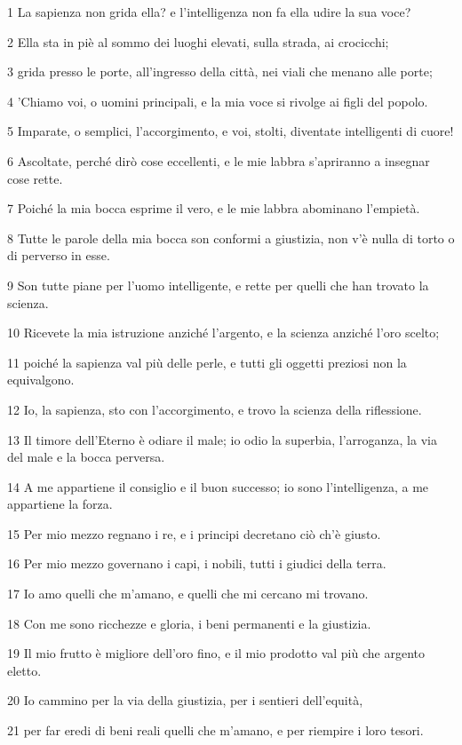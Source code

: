 \par 1 La sapienza non grida ella? e l'intelligenza non fa ella udire la sua voce?
\par 2 Ella sta in piè al sommo dei luoghi elevati, sulla strada, ai crocicchi;
\par 3 grida presso le porte, all'ingresso della città, nei viali che menano alle porte;
\par 4 'Chiamo voi, o uomini principali, e la mia voce si rivolge ai figli del popolo.
\par 5 Imparate, o semplici, l'accorgimento, e voi, stolti, diventate intelligenti di cuore!
\par 6 Ascoltate, perché dirò cose eccellenti, e le mie labbra s'apriranno a insegnar cose rette.
\par 7 Poiché la mia bocca esprime il vero, e le mie labbra abominano l'empietà.
\par 8 Tutte le parole della mia bocca son conformi a giustizia, non v'è nulla di torto o di perverso in esse.
\par 9 Son tutte piane per l'uomo intelligente, e rette per quelli che han trovato la scienza.
\par 10 Ricevete la mia istruzione anziché l'argento, e la scienza anziché l'oro scelto;
\par 11 poiché la sapienza val più delle perle, e tutti gli oggetti preziosi non la equivalgono.
\par 12 Io, la sapienza, sto con l'accorgimento, e trovo la scienza della riflessione.
\par 13 Il timore dell'Eterno è odiare il male; io odio la superbia, l'arroganza, la via del male e la bocca perversa.
\par 14 A me appartiene il consiglio e il buon successo; io sono l'intelligenza, a me appartiene la forza.
\par 15 Per mio mezzo regnano i re, e i principi decretano ciò ch'è giusto.
\par 16 Per mio mezzo governano i capi, i nobili, tutti i giudici della terra.
\par 17 Io amo quelli che m'amano, e quelli che mi cercano mi trovano.
\par 18 Con me sono ricchezze e gloria, i beni permanenti e la giustizia.
\par 19 Il mio frutto è migliore dell'oro fino, e il mio prodotto val più che argento eletto.
\par 20 Io cammino per la via della giustizia, per i sentieri dell'equità,
\par 21 per far eredi di beni reali quelli che m'amano, e per riempire i loro tesori.
